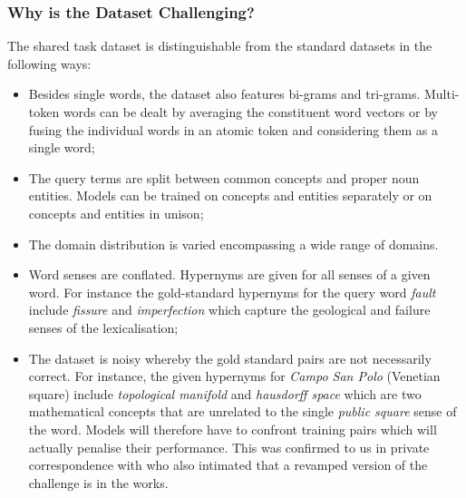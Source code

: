 \subsubsection{Why is the Dataset Challenging?}
The shared task dataset is distinguishable from the standard datasets in the following ways:
\begin{itemize}
    \item Besides single words, the dataset also features bi-grams and tri-grams.  Multi-token words can be dealt by averaging the constituent word vectors or by fusing the individual words in an atomic token and considering them as a single word; 
    \item The query terms are split between common concepts and proper noun entities.  Models can be trained on concepts and entities separately or on concepts and entities in unison;
    \item The domain distribution is varied encompassing a wide range of domains.  
    \item Word senses are conflated.  Hypernyms are given for all senses of a given word.  For instance the gold-standard hypernyms for the query word \textit{fault} include \textit{fissure} and \textit{imperfection} which capture the geological and failure senses of the lexicalisation;
    \item The dataset is noisy whereby the gold standard pairs are not necessarily correct.  For instance, the given hypernyms for \textit{Campo San Polo} (Venetian square) include \textit{topological manifold} and \textit{hausdorff space} which are two mathematical concepts that are unrelated to the single \textit{public square} sense of the word.  Models will therefore have to confront training pairs which will actually penalise their performance.  This was confirmed to us in private correspondence with \citeauthor{camacho2018semeval} who also intimated that a revamped version of the challenge is in the works.
\end{itemize}

